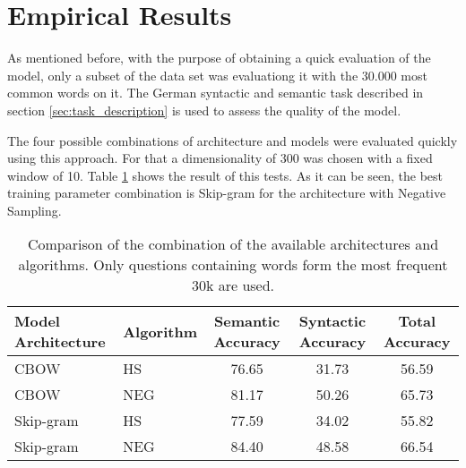 \section{Empirical Results}
\label{sec:sub_empirical_results}

As mentioned before, with the purpose of obtaining  a quick evaluation of the
model, only a subset of the data set was evaluationg it with the 30.000 
most common words on it. The German syntactic and semantic task described in
section \ref{sec:task_description} is used  to assess the quality of the
model. 


The four possible combinations of architecture and models were evaluated
quickly using this approach. For that a dimensionality of 300 was chosen with
a fixed window of 10. Table \ref{tab:initial_w2v_comparison} shows the result
of this tests. As it can be seen, the best training parameter combination is
Skip-gram for the architecture with Negative Sampling.








\begin{table}[h]
\centering
\caption{Comparison of the combination of the available architectures and algorithms.
 Only questions containing words form the most  frequent 30k are used.} 
\label{tab:initial_w2v_comparison}


\begin{center}
\small

\begin{tabular}{|l|l|c|c|c|}
\hline
 Model Architecture  &   Algorithm  &  Semantic Accuracy  &  Syntactic Accuracy  &  Total Accuracy  \\
\hline
 CBOW               &  HS                   &              76.65  &               31.73  &           56.59  \\
 CBOW               &  NEG                  &              81.17  &               50.26  &           65.73  \\
 Skip-gram          &  HS                   &              77.59  &               34.02  &           55.82  \\
 Skip-gram          &  NEG                  &              84.40  &               48.58  &           66.54  \\
\hline
\end{tabular}
\end{center}

\end{table}


